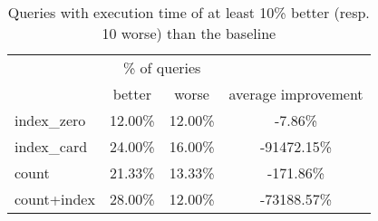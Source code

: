 \documentclass[preview]{standalone}
\begin{document}
 
\begin{table}[!ht] 
\centering 
\begin{tabular}{lccc} 
& \multicolumn{2}{c}{\% of queries} \\\cline{2-3}& better & worse & average improvement \\ \hline 
    index\_zero & 12.00\% & 12.00\% & -7.86\% \\ 
    index\_card & 24.00\% & 16.00\% & -91472.15\% \\ 
    count 		& 21.33\% & 13.33\% & -171.86\% \\ 
    count+index & 28.00\% & 12.00\% & -73188.57\% \\ 
\end{tabular} 
\caption{Queries with execution time of at least 10\% better (resp. 10 worse) than the baseline}
\end{table} 
\end{document}
